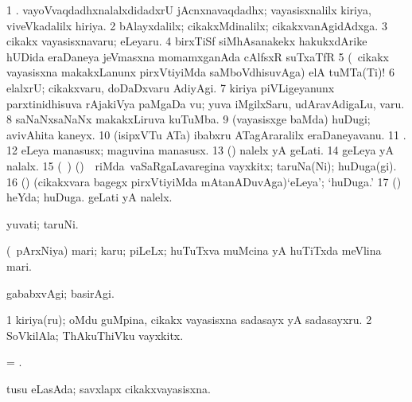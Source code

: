 \noindent
\gl{\pagu} 
\bmng
\bnum
\num{1}  . vayoVvaqdadhxnalalxdidadxrU jAcnxnavaqdadhx; vayasisxnalilx kiriya, viveVkadalilx hiriya.  
\num{2}  bAlayxdalilx; cikakxMdinalilx; cikakxvanAgidAdxga. 
\num{3}  cikakx vayasisxnavaru; eLeyaru. 
\num{4}   birxTiSf siMhAsanakekx hakukxdArike hUDida eraDaneya jeVmasxna momamxganAda cAlfsxR suTxaTfR  
\num{5}  (\sA\ cikakx vayasisxna makakxLanunx pirxVtiyiMda saMboVdhisuvAga) elA tuMTa(Ti)!  
\num{6}  elalxrU; cikakxvaru, doDaDxvaru AdiyAgi. 
\num{7}  kiriya piVLigeyanunx parxtinidhisuva rAjakiVya paMgaDa \mo vu; yuva iMgilxSaru, udAravAdigaLu, \mo varu. 
\num{8}  saNaNxsaNaNx makakxLiruva kuTuMba. 
\num{9}  (vayasisxge baMda) huDugi; avivAhita kaneyx. 
\num{10}  (isipxVTu ATa) ibabxru ATagAraralilx eraDaneyavanu. 
\num{11}  . 
\num{12}  eLeya manasusx; maguvina manasusx. 
\num{13}   (\AmA) nalelx  yA geLati. 
\num{14}  geLeya yA nalalx. 
\num{15}  (\kanmu\ \UK) (\nAyxshA) \sA\ \,riMda \,vaSaRgaLavaregina vayxkitx; taruNa(Ni); huDuga(gi). 
\num{16}  (\pArxparx) (cikakxvara bagegx pirxVtiyiMda mAtanADuvAga)`eLeya'; `huDuga.' 
\num{17}  (\AmA) heYda; huDuga. 
   
\banum
{} geLati yA nalelx. 

  yuvati; taruNi.
\eanum
\numie
\enum
\emng
\eentry

\bentry
{} 
\gl{\nA} 
\bmng
(\sA\ pArxNiya) mari; karu; piLeLx; huTuTxva muMcina yA huTiTxda meVlina mari.
\emng

\noindent
\gl{\pagu} 
\bmng
{} gababxvAgi; basirAgi.
\emng
\eentry

\bentry
{}
\gl{\nA} 
\bmng
\bnum
\num{1} kiriya(ru); oMdu guMpina, cikakx vayasisxna sadasayx yA sadasayxru. 
\num{2} SoVkilAla; ThAkuThiVku vayxkitx.
\enum
\emng
\eentry

\bentry
{}  
\gl{\nA} 
\bmng
= .
\emng
\eentry

\bentry
{} 
\gl{\gu} 
\bmng
tusu eLasAda; savxlapx cikakxvayasisxna.
\emng
\eentry

